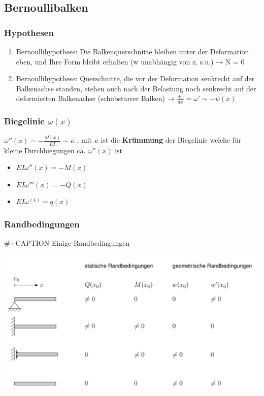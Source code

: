 \documentclass[11pt]{article}
\begin{document}
\subsection{Bernoullibalken}
\label{sec:orgfd38d5c}
\subsubsection{Hypothesen}
\label{sec:org65fcbb3}
\begin{enumerate}
\item Bernoullihypothese:
Die Balkenquerschnitte bleiben unter der Deformation eben, und Ihre Form bleibt erhalten (w unabhängig von z, s.u.) → N = 0
\item Bernoullihypothese:
Querschnitte, die vor der Deformation senkrecht auf der Balkenachse standen, stehen auch nach der Belastung noch senkrecht auf der deformierten Balkenachse (schubstarrer Balken) → \(\frac{dw}{dx} = \omega' \sim -\psi(x)\)
\end{enumerate}
\subsubsection{Biegelinie \(\omega(x)\)}
\label{sec:orgc9c2629}
\(\omega''(x) = -\frac{M(x)}{EI} \sim \kappa\)
, mit \(\kappa\) ist die \textbf{Krümmung} der Biegelinie welche für kleine Durchbiegungen ca. \(\omega''(x)\) ist
\begin{itemize}
\item \(EI\omega''(x) = -M(x)\)
\item \(EI\omega'''(x) = -Q(x)\)
\item \(EI\omega^{(4)} = q(x)\)
\end{itemize}
\subsubsection{Randbedingungen}
\label{sec:orge7f3a63}
\#+CAPTION Einige Randbedingungen
\begin{center}
\includegraphics[width=.9\linewidth]{./img/randbedingungen.png}
\end{center}
\end{document}

